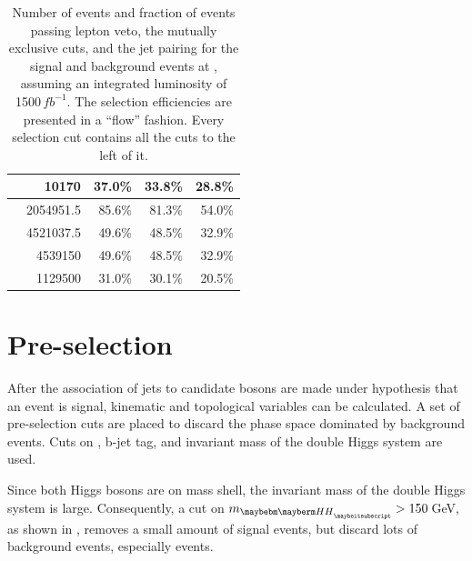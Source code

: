 \begin{table}[!tbp]
\begin{tabular}{lrrrr}
\egamma{\Pepm}{\Pphoton}{\EPA}{\Pquark \Pquark \PHiggs \Pnu} & 10170  & 37.0\% & 33.8\% & 28.8\%\\
\hline
\gammagamma{\Pphoton}{\BS}{\Pphoton}{\BS}{ \Pquark \Pquark \Pquark \Pquark}& 2054951.5  & 85.6\%& 81.3\%& 54.0\%\\
\gammagamma{\Pphoton}{\BS}{\Pphoton}{\EPA}{ \Pquark \Pquark \Pquark \Pquark}& 4521037.5  &49.6\%& 48.5\%& 32.9\%\\
\gammagamma{\Pphoton}{\EPA}{\Pphoton}{\BS}{ \Pquark \Pquark \Pquark \Pquark}& 4539150 & 49.6\%& 48.5\%& 32.9\%\\
\gammagamma{\Pphoton}{\EPA}{\Pphoton}{\EPA}{ \Pquark \Pquark \Pquark \Pquark}& 1129500 & 31.0\% & 30.1\% & 20.5\%\\
\hline \hline
\end{tabular}

\caption
{Number of events and fraction of events passing lepton veto, the mutually exclusive cuts, and the jet pairing  for the signal and background events at , assuming an integrated luminosity of 1500\,$fb^{-1}$. The selection efficiencies are presented in a ``flow'' fashion. Every selection cut contains all the cuts to the left of it.}
\label{tab:doubleHiggs1.4TeVPreslection}
\end{table}


\section{Pre-selection}
\label{sec:doubleHiggsPreSelection}

After the association of jets to candidate bosons are made under hypothesis that an event is signal, kinematic and topological variables can be calculated. A set of pre-selection cuts are placed to discard the phase space dominated by background events. Cuts on \pT, b-jet tag, and invariant mass of the double Higgs system are used.

Since both Higgs bosons are on mass shell,  the invariant mass of the double Higgs system is large. Consequently, a cut on $m_{\HH} > 150$\,GeV, as shown in , removes a small amount of signal events, but discard lots of  background events, especially  \HepProcess{\Gammagamma \to \Pquark \Pquark \Pquark \Pquark} events.

